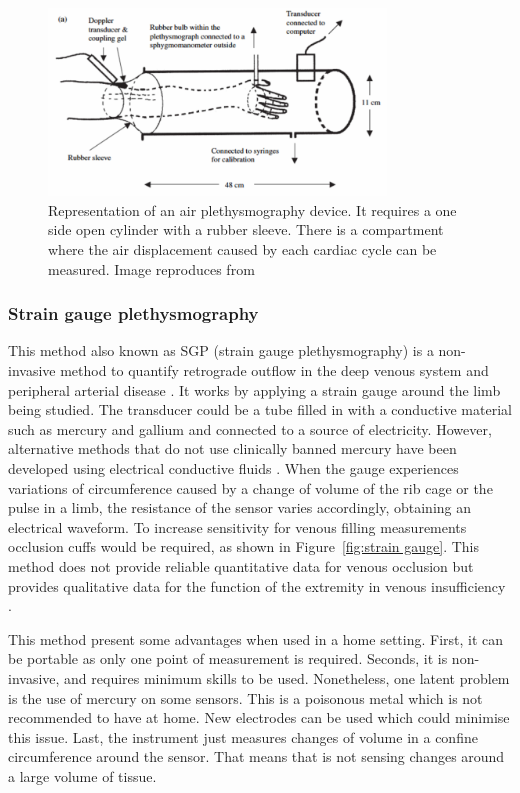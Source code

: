 \begin{figure}[!htpb]
	\centering
	\includegraphics[width=0.8\textwidth,keepaspectratio]{figure4}    
	\caption[Air plethysmography method]{Representation of an air plethysmography device. It requires a one side open cylinder with a rubber sleeve. There is a compartment where the air displacement caused by each cardiac cycle can be measured. Image reproduces from \cite{chuah2004plethysmography}}
	\label{fig:air plethysmography}
\end{figure}

\subsubsection{Strain gauge plethysmography}
\label{section literature stain grauge}
This method also known as SGP (strain gauge plethysmography) is a non-invasive method to quantify retrograde outflow in the deep venous system and peripheral arterial disease \cite{holohan1996plethysmography}. It works by applying a strain gauge around the limb being studied. The transducer could be a tube filled in with a conductive material such as mercury and gallium and connected to a source of electricity. However, alternative methods that do not use clinically banned mercury have been developed using electrical conductive fluids \cite{flowers1981strain}. When the gauge experiences variations of circumference caused by a change of volume of the rib cage or the pulse in a limb, the resistance of the sensor varies accordingly, obtaining an electrical waveform. To increase sensitivity for venous filling measurements occlusion cuffs would be required, as shown in Figure~\ref{fig:strain gauge}. This method does not provide reliable quantitative data for venous occlusion but provides qualitative data for the function of the extremity in venous insufficiency \cite{holohan1996plethysmography}. 

This method present some advantages when used in a home setting. First, it can be portable as only one point of measurement is required. Seconds, it is non-invasive, and requires minimum skills to be used. Nonetheless, one latent problem is the use of mercury on some sensors. This is a poisonous metal which is not recommended to have at home. New electrodes can be used \cite{flowers1981strain} which could minimise this issue. Last, the instrument just measures changes of volume in a confine circumference around the sensor. That means that is not sensing changes around a large volume of tissue. 

